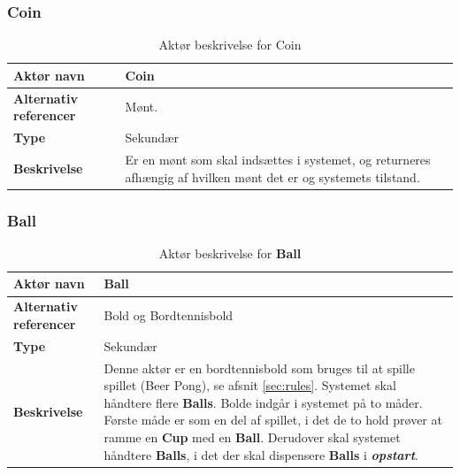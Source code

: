 \documentclass[Kravspecifikation/Kravspec_Main.tex]{subfiles}
\begin{document}
\subsubsection{Coin}
\begin{table}[H]
    \centering
    \begin{tabular}{|L{0.35\textwidth}|L{0.65\textwidth}|}
        \hline
        \textbf{Aktør navn} & Coin \\ \hline
        \textbf{Alternativ referencer} & Mønt. \\ \hline
        \textbf{Type} &  Sekundær \\ \hline
        \textbf{Beskrivelse} & Er en mønt som skal indsættes i systemet, og returneres afhængig af hvilken mønt det er og systemets tilstand. \\ \hline
    \end{tabular}
    \caption{Aktør beskrivelse for Coin}
    \label{tab:CoinBeskrivelse}
\end{table}

\subsubsection{Ball}
\begin{table}[H]
    \centering
    \begin{tabular}{|L{0.35\textwidth}|L{0.65\textwidth}|}
        \hline
        \textbf{Aktør navn} & Ball \\ \hline
        \textbf{Alternativ referencer} & Bold og Bordtennisbold \\ \hline
        \textbf{Type} & Sekundær \\ \hline
        \textbf{Beskrivelse} & Denne aktør er en bordtennisbold\cite{pingpongball} som bruges til at spille spillet (Beer Pong), se afsnit \ref{sec:rules}. Systemet skal håndtere flere \textbf{Balls}. Bolde indgår i systemet på to måder. Første måde er som en del af spillet, i det de to hold prøver at ramme en \textbf{Cup} med en \textbf{Ball}. Derudover skal systemet håndtere \textbf{Balls}, i det der skal dispensere \textbf{Balls} i \textbf{\textit{opstart}}.\\ \hline
    \end{tabular}
    \caption{Aktør beskrivelse for \textbf{Ball}}
    \label{tab:BallBeskrivelse}
\end{table}
\end{document}
